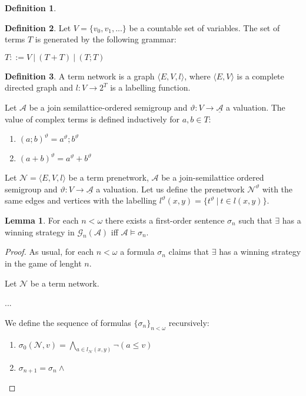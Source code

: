 \documentclass[a4paper]{article}
\theoremstyle{definition}
\newtheorem{definition}{Definition}
\theoremstyle{theorem}
\theoremstyle{proposition}
\theoremstyle{lemma}
\newtheorem{lemma}{Lemma}
\theoremstyle{ex}
\theoremstyle{corollary}
\theoremstyle{claim}
\begin{document}
\begin{definition}

\end{definition}

\begin{definition}
  Let $V = \{ v_0, v_1, ... \}$ be a countable set of variables. The set of terms $T$ is generated by the following grammar:

  \begin{center}
    $T ::= V \: | \: (T + T) \: | \: (T ; T)$
  \end{center}
\end{definition}

\begin{definition}
  A term network is a graph $\langle E, V, l \rangle$, where $\langle E, V \rangle$ is a complete directed graph and $l : V \to 2^T$ is a labelling function.
\end{definition}

Let $\mathcal{A}$ be a join semilattice-ordered semigroup and $\vartheta : V \to \underline{{\mathcal{A}}}$ a valuation. The value of complex terms is defined inductively for $a, b \in T$:

\begin{enumerate}
  \item $(a ; b)^{\vartheta} = a^{\vartheta} ; b^{\vartheta}$
  \item $(a + b)^{\vartheta} = a^{\vartheta} + b^{\vartheta}$
\end{enumerate}

Let $\mathcal{N} = \langle E, V, l \rangle$ be a term prenetwork, $\mathcal{A}$ be a join-semilattice ordered semigroup and $\vartheta : V \to \underline{{\mathcal{A}}}$ a valuation. Let us define the prenetwork $\mathcal{N}^{\vartheta}$ with the same edges and vertices with the labelling $l^{\vartheta}(x, y) = \{ t^{\vartheta} \: | \: t \in l(x, y)\}$.

\begin{lemma}\label{ax}
  For each $n < \omega$ there exists a first-order sentence $\sigma_n$ such that $\exists$ has a winning strategy in $\mathcal{G}_n(\mathcal{A})$ iff $\mathcal{A} \models \sigma_n$.
\end{lemma}

\begin{proof}
  As usual, for each $n < \omega$ a formula $\sigma_n$ claims that $\exists$ has a winning strategy in the game of lenght $n$.

  Let $\mathcal{N}$ be a term network.

  ...

  We define the sequence of formulas $\{ \sigma_n \}_{n < \omega}$ recursively:
  \begin{enumerate}
    \item $\sigma_0(\mathcal{N}, v) = \bigwedge \limits_{a \in l_{\mathcal{N}}(x, y)} \neg (a \leq v)$

    \item $\sigma_{n + 1} = \sigma_{n} \land $
  \end{enumerate}
\end{proof}
\end{document}

